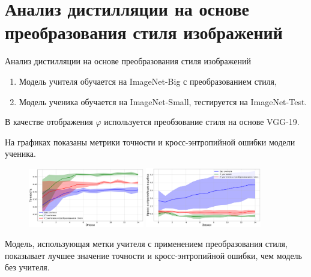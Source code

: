 \documentclass[10pt,pdf,hyperref={unicode}]{beamer}
\begin{document}
\section{Анализ дистилляции на основе преобразования стиля изображений}
\begin{frame}{Анализ дистилляции на основе преобразования стиля изображений}
\justifying
\begin{enumerate}[1)]
    \item Модель учителя обучается на ImageNet-Big с преобразованием стиля,
    \item Модель ученика обучается на ImageNet-Small, тестируется на ImageNet-Test.
\end{enumerate}

\par
В качестве отображения $\varphi$ используется преобзование стиля на основе VGG-19.

На графиках показаны метрики точности и кросс-энтропийной ошибки модели ученика.

\begin{figure}[h!]
\includegraphics[width=0.45\textwidth]{results/styletransfer_acc.png}
\includegraphics[width=0.45\textwidth]{results/styletransfer_loss.png}
\end{figure}

Модель, использующая метки учителя с применением преобразования стиля, показывает лучшее значение точности и кросс-энтропийной ошибки, чем модель без учителя.

\end{frame}

\end{document}
